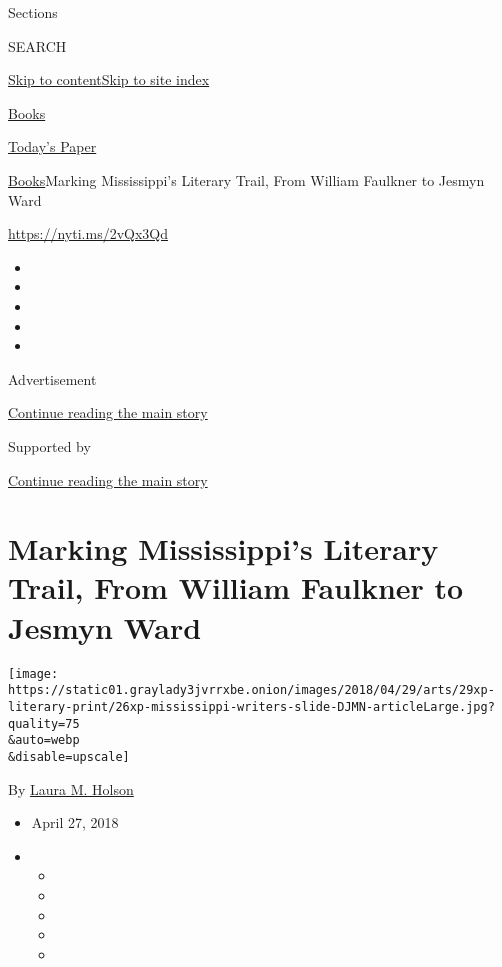 Sections

SEARCH

\protect\hyperlink{site-content}{Skip to
content}\protect\hyperlink{site-index}{Skip to site index}

\href{https://www.nytimes3xbfgragh.onion/section/books}{Books}

\href{https://myaccount.nytimes3xbfgragh.onion/auth/login?response_type=cookie\&client_id=vi}{}

\href{https://www.nytimes3xbfgragh.onion/section/todayspaper}{Today's
Paper}

\href{/section/books}{Books}\textbar{}Marking Mississippi's Literary
Trail, From William Faulkner to Jesmyn Ward

\url{https://nyti.ms/2vQx3Qd}

\begin{itemize}
\item
\item
\item
\item
\item
\end{itemize}

Advertisement

\protect\hyperlink{after-top}{Continue reading the main story}

Supported by

\protect\hyperlink{after-sponsor}{Continue reading the main story}

\hypertarget{marking-mississippis-literary-trail-from-william-faulkner-to-jesmyn-ward}{%
\section{Marking Mississippi's Literary Trail, From William Faulkner to
Jesmyn
Ward}\label{marking-mississippis-literary-trail-from-william-faulkner-to-jesmyn-ward}}

\texttt{[image: https://static01.graylady3jvrrxbe.onion/images/2018/04/29/arts/29xp-literary-print/26xp-mississippi-writers-slide-DJMN-articleLarge.jpg?quality=75\\\&auto=webp\\\&disable=upscale]}

By \href{http://www.nytimes3xbfgragh.onion/by/laura-m-holson}{Laura M.
Holson}

\begin{itemize}
\item
  April 27, 2018
\item
  \begin{itemize}
  \item
  \item
  \item
  \item
  \item
  \end{itemize}
\end{itemize}

